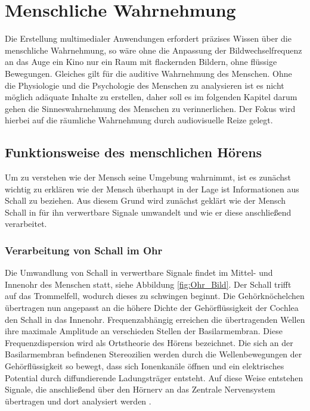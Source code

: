 \chapter{Menschliche Wahrnehmung}

Die Erstellung multimedialer Anwendungen erfordert präzises Wissen über die menschliche Wahrnehmung, so wäre ohne die Anpassung der Bildwechselfrequenz an das Auge ein Kino nur ein Raum mit flackernden Bildern, ohne flüssige Bewegungen. Gleiches gilt für die auditive Wahrnehmung des Menschen. Ohne die Physiologie und die Psychologie des Menschen zu analysieren ist es nicht möglich adäquate Inhalte zu erstellen, daher soll es im folgenden Kapitel darum gehen die Sinneswahrnehmung des Menschen zu verinnerlichen. Der Fokus wird hierbei auf die räumliche Wahrnehmung durch audiovisuelle Reize gelegt. 

\section{Funktionsweise des menschlichen Hörens}
Um zu verstehen wie der Mensch seine Umgebung wahrnimmt, ist es zunächst wichtig zu erklären wie der Mensch überhaupt in der Lage ist Informationen aus Schall zu beziehen. Aus diesem Grund wird zunächst geklärt wie der Mensch Schall in für ihn verwertbare Signale umwandelt und wie er diese anschließend verarbeitet.

\subsection{Verarbeitung von Schall im Ohr}

Die Umwandlung von Schall in verwertbare Signale findet im Mittel- und Innenohr des Menschen statt, siehe Abbildung \ref{fig:Ohr_Bild}. Der Schall trifft auf das Trommelfell, wodurch dieses zu schwingen beginnt. Die Gehörknöchelchen übertragen nun angepasst an die höhere Dichte der Gehörflüssigkeit der Cochlea den Schall in das Innenohr. Frequenzabhängig erreichen die übertragenden Wellen ihre maximale Amplitude an verschieden Stellen der Basilarmembran. Diese Frequenzdispersion wird als Ortstheorie des Hörens bezeichnet. Die sich an der Basilarmembran befindenen Stereozilien werden durch die Wellenbewegungen der Gehörflüssigkeit so bewegt, dass sich Ionenkanäle öffnen und ein elektrisches Potential durch diffundierende Ladungsträger entsteht. Auf diese Weise entstehen Signale, die  anschließend über den Hörnerv an das Zentrale Nervensystem übertragen und dort analysiert werden \cite[S.48]{HdA08}. 

